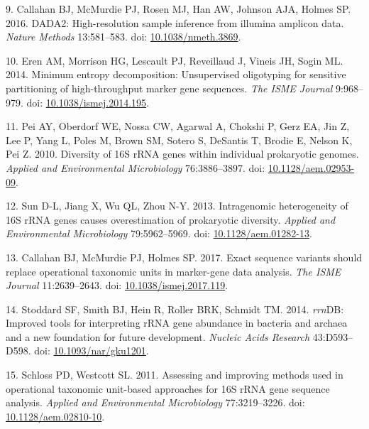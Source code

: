 \documentclass[
]{article}
\newenvironment{cslreferences}%
  {}%
  {\par}
\begin{document}
\begin{cslreferences}
\leavevmode\hypertarget{ref-Callahan2016}{}%
9. Callahan BJ, McMurdie PJ, Rosen MJ, Han AW, Johnson AJA, Holmes SP.
2016. DADA2: High-resolution sample inference from illumina amplicon
data. \emph{Nature Methods} 13:581--583. doi:
\href{https://doi.org/10.1038/nmeth.3869}{10.1038/nmeth.3869}.

\leavevmode\hypertarget{ref-Eren2014}{}%
10. Eren AM, Morrison HG, Lescault PJ, Reveillaud J, Vineis JH, Sogin
ML. 2014. Minimum entropy decomposition: Unsupervised oligotyping for
sensitive partitioning of high-throughput marker gene sequences.
\emph{The ISME Journal} 9:968--979. doi:
\href{https://doi.org/10.1038/ismej.2014.195}{10.1038/ismej.2014.195}.

\leavevmode\hypertarget{ref-Pei2010}{}%
11. Pei AY, Oberdorf WE, Nossa CW, Agarwal A, Chokshi P, Gerz EA, Jin Z,
Lee P, Yang L, Poles M, Brown SM, Sotero S, DeSantis T, Brodie E, Nelson
K, Pei Z. 2010. Diversity of 16S rRNA genes within individual
prokaryotic genomes. \emph{Applied and Environmental Microbiology}
76:3886--3897. doi:
\href{https://doi.org/10.1128/aem.02953-09}{10.1128/aem.02953-09}.

\leavevmode\hypertarget{ref-Sun2013}{}%
12. Sun D-L, Jiang X, Wu QL, Zhou N-Y. 2013. Intragenomic heterogeneity
of 16S rRNA genes causes overestimation of prokaryotic diversity.
\emph{Applied and Environmental Microbiology} 79:5962--5969. doi:
\href{https://doi.org/10.1128/aem.01282-13}{10.1128/aem.01282-13}.

\leavevmode\hypertarget{ref-Callahan2017}{}%
13. Callahan BJ, McMurdie PJ, Holmes SP. 2017. Exact sequence variants
should replace operational taxonomic units in marker-gene data analysis.
\emph{The ISME Journal} 11:2639--2643. doi:
\href{https://doi.org/10.1038/ismej.2017.119}{10.1038/ismej.2017.119}.

\leavevmode\hypertarget{ref-Stoddard2014}{}%
14. Stoddard SF, Smith BJ, Hein R, Roller BRK, Schmidt TM. 2014.
\emph{rrn}DB: Improved tools for interpreting rRNA gene abundance in
bacteria and archaea and a new foundation for future development.
\emph{Nucleic Acids Research} 43:D593--D598. doi:
\href{https://doi.org/10.1093/nar/gku1201}{10.1093/nar/gku1201}.

\leavevmode\hypertarget{ref-Schloss2011}{}%
15. Schloss PD, Westcott SL. 2011. Assessing and improving methods used
in operational taxonomic unit-based approaches for 16S rRNA gene
sequence analysis. \emph{Applied and Environmental Microbiology}
77:3219--3226. doi:
\href{https://doi.org/10.1128/aem.02810-10}{10.1128/aem.02810-10}.


\end{cslreferences}
\end{document}
